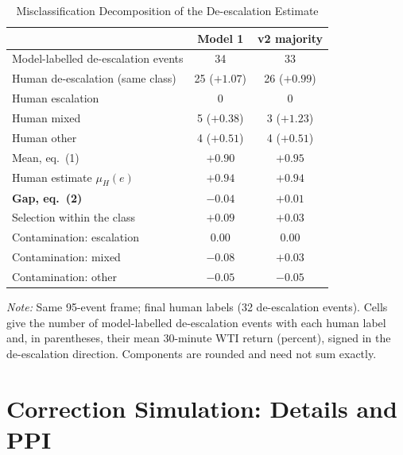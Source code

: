 \documentclass[11pt]{article}
\begin{document}
\begin{table}[h]
\centering
\small
\caption{Misclassification Decomposition of the De-escalation Estimate}
\label{tab:decomp-deesc}
\begin{tabular}{lcc}
\toprule
 & Model 1 & v2 majority \\
\midrule
Model-labelled de-escalation events & 34 & 33 \\
\quad Human de-escalation (same class) & 25 ($+1.07$) & 26 ($+0.99$) \\
\quad Human escalation & 0 & 0 \\
\quad Human mixed & 5 ($+0.38$) & 3 ($+1.23$) \\
\quad Human other & 4 ($+0.51$) & 4 ($+0.51$) \\
\midrule
Mean, eq.~(1) & $+0.90$ & $+0.95$ \\
Human estimate $\mu_H(e)$ & $+0.94$ & $+0.94$ \\
\textbf{Gap, eq.~(2)} & $\mathbf{-0.04}$ & $\mathbf{+0.01}$ \\
\quad Selection within the class & $+0.09$ & $+0.03$ \\
\quad Contamination: escalation & $0.00$ & $0.00$ \\
\quad Contamination: mixed & $-0.08$ & $+0.03$ \\
\quad Contamination: other & $-0.05$ & $-0.05$ \\
\bottomrule
\end{tabular}

\vspace{0.5em}
\begin{minipage}{0.85\textwidth}
\footnotesize\textit{Note:} Same 95-event frame; final human labels (32 de-escalation events). Cells give the number of model-labelled de-escalation events with each human label and, in parentheses, their mean 30-minute WTI return (percent), signed in the de-escalation direction. Components are rounded and need not sum exactly.
\end{minipage}
\end{table}

\section{Correction Simulation: Details and PPI}
\label{sec:sim}
\end{document}
